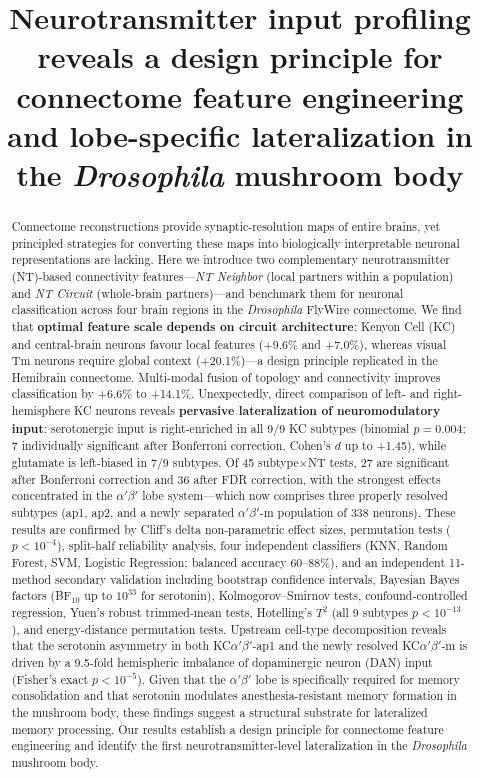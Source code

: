 \documentclass[10pt]{article}
\title{\Large\bfseries Neurotransmitter input profiling reveals a design principle for connectome feature engineering and lobe-specific lateralization in the \textit{Drosophila} mushroom body}
\author{}
\date{}
\begin{document}
\maketitle
\thispagestyle{empty}

\begin{abstract}
\noindent
Connectome reconstructions provide synaptic-resolution maps of entire brains, yet principled strategies for converting these maps into biologically interpretable neuronal representations are lacking. Here we introduce two complementary neurotransmitter (NT)-based connectivity features---\textit{NT Neighbor} (local partners within a population) and \textit{NT Circuit} (whole-brain partners)---and benchmark them for neuronal classification across four brain regions in the \textit{Drosophila} FlyWire connectome. We find that \textbf{optimal feature scale depends on circuit architecture}: Kenyon Cell (KC) and central-brain neurons favour local features (+9.6\% and +7.0\%), whereas visual Tm neurons require global context (+20.1\%)---a design principle replicated in the Hemibrain connectome. Multi-modal fusion of topology and connectivity improves classification by +6.6\% to +14.1\%. Unexpectedly, direct comparison of left- and right-hemisphere KC neurons reveals \textbf{pervasive lateralization of neuromodulatory input}: serotonergic input is right-enriched in all 9/9 KC subtypes (binomial $p = 0.004$; 7 individually significant after Bonferroni correction, Cohen's $d$ up to +1.45), while glutamate is left-biased in 7/9 subtypes. Of 45 subtype$\times$NT tests, 27 are significant after Bonferroni correction and 36 after FDR correction, with the strongest effects concentrated in the $\alpha'\beta'$ lobe system---which now comprises three properly resolved subtypes (ap1, ap2, and a newly separated $\alpha'\beta'$-m population of 338 neurons). These results are confirmed by Cliff's delta non-parametric effect sizes, permutation tests ($p < 10^{-4}$), split-half reliability analysis, four independent classifiers (KNN, Random Forest, SVM, Logistic Regression; balanced accuracy 60--88\%), and an independent 11-method secondary validation including bootstrap confidence intervals, Bayesian Bayes factors (BF$_{10}$ up to $10^{33}$ for serotonin), Kolmogorov--Smirnov tests, confound-controlled regression, Yuen's robust trimmed-mean tests, Hotelling's $T^2$ (all 9 subtypes $p < 10^{-13}$), and energy-distance permutation tests. Upstream cell-type decomposition reveals that the serotonin asymmetry in both KC$\alpha'\beta'$-ap1 and the newly resolved KC$\alpha'\beta'$-m is driven by a 9.5-fold hemispheric imbalance of dopaminergic neuron (DAN) input (Fisher's exact $p < 10^{-5}$). Given that the $\alpha'\beta'$ lobe is specifically required for memory consolidation and that serotonin modulates anesthesia-resistant memory formation in the mushroom body, these findings suggest a structural substrate for lateralized memory processing. Our results establish a design principle for connectome feature engineering and identify the first neurotransmitter-level lateralization in the \textit{Drosophila} mushroom body.
\end{abstract}
\end{document}
